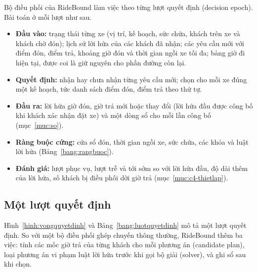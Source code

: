 Bộ điều phối của RideBound làm việc theo từng lượt quyết định (decision epoch). Bài toán ở mỗi lượt như
sau.
\begin{itemize}[leftmargin=1.2cm,itemsep=2pt,topsep=3pt]
\item \textbf{Đầu vào:} trạng thái từng xe (vị trí, kế hoạch, sức chứa, khách trên xe và khách chờ đón);
lịch sử lời hứa của các khách đã nhận; các yêu cầu mới với điểm đón, điểm trả, khoảng giờ đón và thời
gian ngồi xe tối đa; bảng giờ đi hiện tại, được coi là giữ nguyên cho phần đường còn lại.
\item \textbf{Quyết định:} nhận hay chưa nhận từng yêu cầu mới; chọn cho mỗi xe đúng một kế hoạch, tức
danh sách điểm đón, điểm trả theo thứ tự.
\item \textbf{Đầu ra:} lời hứa giờ đón, giờ trả mới hoặc thay đổi (lời hứa đầu được công bố khi khách
xác nhận đặt xe) và một dòng sổ cho mỗi lần công bố (mục~\ref{muc:so}).
\item \textbf{Ràng buộc cứng:} cửa sổ đón, thời gian ngồi xe, sức chứa, các khóa và luật lời hứa
(Bảng~\ref{bang:rangbuoc}).
\item \textbf{Đánh giá:} lượt phục vụ, lượt trễ và tới sớm so với lời hứa đầu, độ dài thêm của lời hứa,
số khách bị điều phối dời giờ trả (mục~\ref{muc:c4-thietlap}).
\end{itemize}

\subsection{Một lượt quyết định}
\label{muc:luotquyetdinh}

Hình~\ref{hinh:vongquyetdinh} và Bảng~\ref{bang:luotquyetdinh} mô tả một lượt quyết định. So với một
bộ điều phối ghép chuyến thông thường, RideBound thêm ba việc: tính các mốc giờ trả của từng khách cho
mỗi phương án (candidate plan), loại phương án vi phạm luật lời hứa trước khi gọi bộ giải (solver), và
ghi sổ sau khi chọn.

